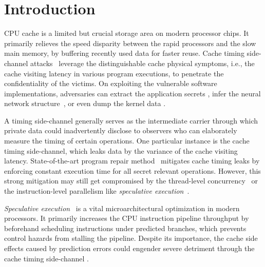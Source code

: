 \documentclass[sigconf]{acmart}
\begin{document}
\section{Introduction}
\label{sec:intro}



CPU cache is a limited but crucial storage area on modern processor chips. 
It primarily relieves the speed disparity between the rapid processors and 
the slow main memory, by buffering recently used data for faster reuse. Cache 
timing side-channel attacks~\cite{Kocher96,DhemKLMQW98} leverage the 
distinguishable cache physical symptoms, i.e., the cache visiting latency 
in various program executions, to penetrate the confidentiality of the victims. 
On exploiting the vulnerable software implementations, adversaries can extract 
the application secrets
\cite{OsvikST06,TromerOS10,GullaschBK11,CGM16}, infer the neural network 
structure~\cite{YanFT18,HuLDLXJDLSX18,HongDKLRKDD18,DudduSRB18}, or even dump 
the kernel data
\cite{HundWH13,LippSGPHFHMKGYH18,KocherGGHHLMPSY19,WeisseVMGKPSSWY18}.


A timing side-channel generally serves as the intermediate carrier through
which private data could inadvertently disclose to observers who can 
elaborately measure the timing of certain operations. One particular instance 
is the cache timing side-channel, which leaks data by the variance of the 
cache visiting latency. State-of-the-art program repair method~\cite{WuGSW18} 
mitigates cache timing leaks by enforcing constant execution time for all 
secret relevant operations. However, this strong mitigation may still get 
compromised by the thread-level concurrency~\cite{GuoWW18} or the 
instruction-level parallelism like \textit{speculative execution}~\cite{kimuraKT1996}.


\textit{Speculative execution}~\cite{kimuraKT1996} is a vital microarchitectural
optimization in modern processors. It primarily increases the CPU instruction 
pipeline throughput by beforehand scheduling instructions under predicted branches, 
which prevents control hazards from stalling the pipeline. Despite its importance, 
the cache side effects caused by prediction errors could engender severe detriment 
through the cache timing side-channel
\cite{KocherGGHHLMPSY19,BulckMWGKPSWYS18,WeisseVMGKPSSWY18,IslamMBKGES19}. 
\end{document}
